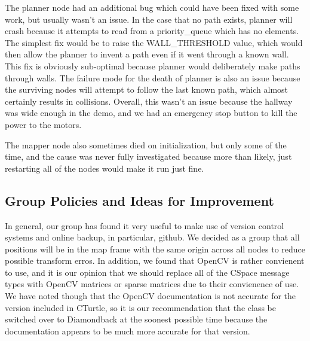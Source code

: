 \documentclass{article}
\begin{document}
The planner node had an additional bug which could have been fixed with some work, but usually wasn't an issue.  
In the case that no path exists, planner will crash because it attempts to read from a priority_queue which has no elements.
The simplest fix would be to raise the WALL_THRESHOLD value, which would then allow the planner to invent a path even if it went through a known wall.  
This fix is obviously sub-optimal because planner would deliberately make paths through walls.
The failure mode for the death of planner is also an issue because the surviving nodes will attempt to follow the last known path, which almost certainly results in collisions.
Overall, this wasn't an issue because the hallway was wide enough in the demo, and we had an emergency stop button to kill the power to the motors.


The mapper node also sometimes died on initialization, but only some of the time, and the cause was never fully investigated because more than likely, just restarting all of the nodes would make it run just fine.

\subsection{Group Policies and Ideas for Improvement}

In general, our group has found it very useful to make use of version control systems and online backup, in particular, github.
We decided as a group that all positions will be in the map frame with the same origin across all nodes to reduce possible transform erros.
In addition, we found that OpenCV is rather convienent to use, and it is our opinion that we should replace all of the CSpace message types with OpenCV matrices or sparse matrices due to their convienence of use.
We have noted though that the OpenCV documentation is not accurate for the version included in CTurtle, so it is our recommendation that the class be switched over to Diamondback at the soonest possible time because the documentation appears to be much more accurate for that version.
\end{document}
